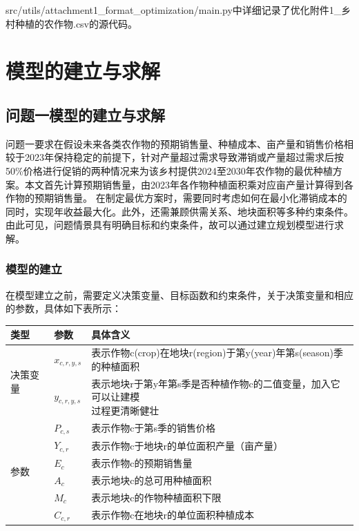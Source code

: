 \documentclass[withoutpreface]{cumcmthesis}
\begin{document}
src/utils/attachment1\_format\_optimization/main.py中详细记录了优化附件1\_乡村种植的农作物.csv的源代码。

\newpage
\section{模型的建立与求解}
\subsection{问题一模型的建立与求解}
问题一要求在假设未来各类农作物的预期销售量、种植成本、亩产量和销售价格相较于2023年保持稳定的前提下，针对产量超过需求导致滞销或产量超过需求后按50\%价格进行促销的两种情况来为该乡村提供2024至2030年农作物的最优种植方案。本文首先计算预期销售量，由2023年各作物种植面积乘对应亩产量计算得到各作物的预期销售量。
在制定最优方案时，需要同时考虑如何在最小化滞销成本的同时，实现年收益最大化。此外，还需兼顾供需关系、地块面积等多种约束条件。由此可见，问题情景具有明确目标和约束条件，故可以通过建立规划模型进行求解。



\subsubsection{模型的建立}
在模型建立之前，需要定义决策变量、目标函数和约束条件，关于决策变量和相应的参数，具体如下表所示：
\begin{table}[H]
    \centering
    \begin{tabular}{|l|l|l|}
        \hline
        类型 & 参数 & 具体含义 \\ \hline
        \multirow{2}{*}{决策变量} & $x_{c,r,y,s}$ & 表示作物c(crop)在地块r(region)于第y(year)年第s(season)季的种植面积 \\ \cline{2-3}
        ~ & $y_{c,r,y,s}$ & \makecell{表示地块r于第y年第s季是否种植作物c的二值变量，加入它可以让建模\\过程更清晰健壮} \\ \hline
        \multirow{6}{*}{\centering 参数} & $P_{c,s}$ & 表示作物c于第s季的销售价格 \\ \cline{2-3}
        ~ & $Y_{c,r}$ & 表示作物c于地块r的单位面积产量（亩产量） \\ \cline{2-3}
        ~ & $E_{c}$ & 表示作物c的预期销售量 \\ \cline{2-3}
        ~ & $A_c$ & 表示地块c的总可用种植面积 \\ \cline{2-3}
        ~ & $M_c$ & 表示地块c的作物种植面积下限 \\ \cline{2-3}
        ~ & $C_{c,r}$ & 表示作物c在地块r的单位面积种植成本 \\ \hline
    \end{tabular}
\end{table}
\end{document}
